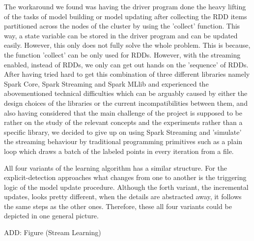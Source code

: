 \documentclass[12pt]{article}
\begin{document}
The workaround we found was having the driver program done the heavy lifting of the tasks of model building or model updating after collecting the RDD items partitioned across the nodes of the cluster by using the 'collect' function. This way, a state variable can be stored in the driver program and can be updated easily. However, this only does not fully solve the whole problem. This is because, the function 'collect' can be only used for RDDs. However, with the streaming enabled, instead of RDDs, we only can get out hands on the 'sequence' of RDDs. After having tried hard to get this combination of three different libraries namely Spark Core, Spark Streaming and Spark MLlib and experienced the abovementioned technical difficulties which can be arguably caused by either the design choices of the libraries or the current incompatibilities between them, and also having considered that the main challenge of the project is supposed to be rather on the study of the relevant concepts and the experiments rather than a specific library, we decided to give up on using Spark Streaming and 'simulate' the streaming behaviour by traditional programming primitives such as a plain loop which draws a batch of the labeled points in every iteration from a file.

All four variants of the learning algorithm has a similar structure. For the explicit-detection approaches what changes from one to another is the triggering logic of the model update procedure. Although the forth variant, the incremental updates, looks pretty different, when the details are abstracted away, it follows the same steps as the other ones. Therefore, these all four variants could be depicted in one general picture.

ADD: Figure (Stream Learning)
\end{document}
